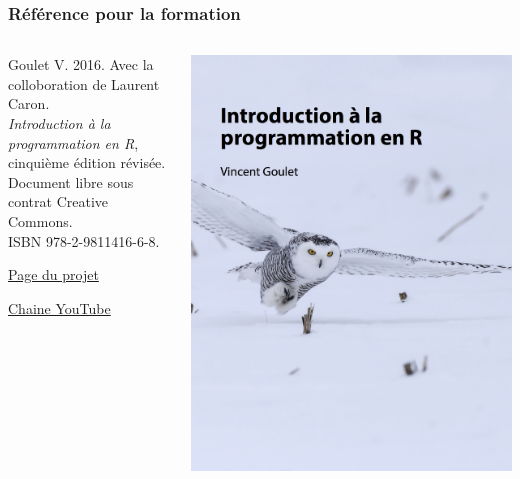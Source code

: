 \begin{frame}
  \frametitle{Référence pour la formation}

  \begin{columns}
    \begin{column}{.5\textwidth}
      Goulet V. 2016. Avec la colloboration de
      Laurent Caron. \\
      \emph{Introduction à la programmation en R},
      cinquième édition révisée. \\
      Document libre sous contrat Creative
      Commons. \\
      ISBN 978-2-9811416-6-8.
      \bigskip

      \href{https://vigou3.github.io/introduction-programmation-r}{%
        Page du projet}

      \href{http://www.youtube.com/user/VincentGouletIntroR/videos}{%
        Chaine YouTube}
    \end{column}
    \begin{column}{.4\textwidth}
      \includegraphics[width=\linewidth,frame]{introduction-programmation-r}
    \end{column}
  \end{columns}
\end{frame}

